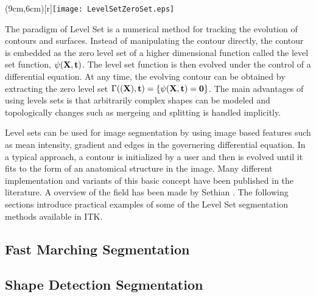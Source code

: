 %
%
% 
%
%
%



\parpic(9cm,6cm)[r]{\texttt{[image: LevelSetZeroSet.eps]}}

The paradigm of Level Set is a numerical method for tracking the evolution of
contours and surfaces. Instead of manipulating the contour directly, the
contour is embedded as the zero level set of a higher dimensional function
called the level set function, $\psi(\bf{X},t)$. The level set function is then
evolved under the control of a differential equation. At any time, the evolving
contour can be obtained by extracting the zero level set $\Gamma(\bf(X),t) =
\{\psi(\bf{X},t) = 0\}$.  The main advantages of using levels sets is that
arbitrarily complex shapes can be modeled and topologically changes such as
mergeing and splitting is handled implicitly.

Level sets can be used for image segmentation by using image based features such
as mean intensity, gradient and edges in the governering differential equation. 
In a typical approach, a contour is initialized by a user and then is evolved 
until it fits to the form of an anatomical structure in the image. 
Many different implementation and variants of this basic concept have been
published in the literature. A overview of the field has been made by Sethian
\cite{Sethian1996}. The following sections introduce practical examples of some
of the Level Set segmentation methods available in ITK.


\subsection{Fast Marching Segmentation}
\label{sec:FastMarchingImageFilter}

\ifitkFullVersion

\fi



\subsection{Shape Detection Segmentation}
\label{sec:ShapeDetectionLevelSetFilter}


